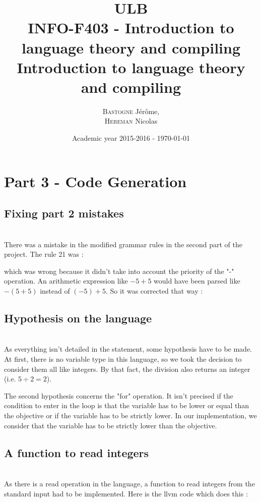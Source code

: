 \documentclass[a4paper,10pt]{report}
\title{ULB\\
        INFO-F403 - Introduction to language theory and compiling \\
            Introduction to language theory and compiling}
\author{\textsc{Bastogne} Jérôme,\\
        \textsc{Hereman} Nicolas}
\date{Academic year 2015-2016 - \today}
\begin{document}
\maketitle
\clearpage


\chapter*{Part 3 - Code Generation}

\section*{Fixing part 2 mistakes}

\hfill \\
There was a mistake in the modified grammar rules in the second part of the project. The rule 21 was :

which was wrong because it didn't take into account the priority of the "-" operation. An arithmetic expression like $-5+5$ would have been parsed like $-(5+5)$ instead of $(-5) + 5$. So it was corrected that way :


\section*{Hypothesis on the language}

\hfill \\
As everything isn't detailed in the statement, some hypothesis have to be made. At first, there is no variable type in this language, so we took the decision to consider them all like integers. By that fact, the division also returns an integer (i.e. $5\div2=2$).

The second hypothesis concerns the "for" operation. It isn't precised if the condition to enter in the loop is that the variable has to be lower or equal than the objective or if the variable has to be strictly lower. In our implementation, we consider that the variable has to be strictly lower than the objective.

\section*{A function to read integers}

\hfill \\
As there is a read operation in the language, a function to read integers from the standard input had to be implemented. Here is the llvm code which does this :
\end{document}
